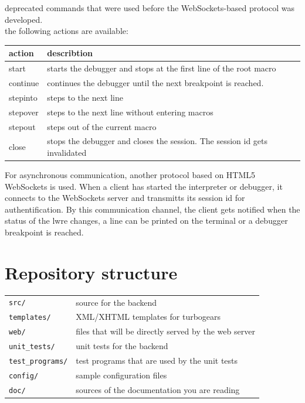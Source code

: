 \text{*} deprecated commands that were used before the WebSockets-based protocol was developed.\\
\text{**} the following actions are available:

\begin{tabular}{l l l}
\hline
action      & describtion \\
\hline
start       & starts the debugger and stops at the first line of the root macro\\
continue    & continues the debugger until the next breakpoint is reached.\\
stepinto    & steps to the next line\\
stepover    & steps to the next line without entering macros\\
stepout     & steps out of the current macro\\
close       & stops the debugger and closes the session. The session id gets invalidated\\
\hline
\end{tabular}

For asynchronous communication, another protocol based on HTML5 WebSockets is used.
When a client has started the interpreter or debugger, it connects to the WebSockets
server and transmitts its session id for authentification. By this communication channel,
the client gets notified when the status of the lwre changes, a line can be printed on the
terminal or a debugger breakpoint is reached.

\section{Repository structure}
\begin{tabular}{l l}
\verb|src/|           & source for the backend\\
\verb|templates/|     & XML/XHTML templates for turbogears\\
\verb|web/|           & files that will be directly served by the web server\\
\verb|unit_tests/|    & unit tests for the backend\\
\verb|test_programs/| & test programs that are used by the unit tests\\
\verb|config/|        & sample configuration files\\
\verb|doc/|           & sources of the documentation you are reading
\end{tabular}
